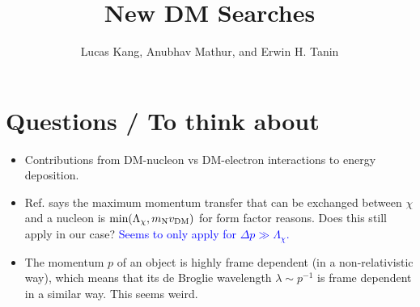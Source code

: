 \documentclass[%
 reprint,
 amsmath,amssymb,
 aps,nofootinbib
]{revtex4-1}
\begin{document}
\title{New DM Searches}
\author{Lucas Kang, Anubhav Mathur, and Erwin H. Tanin}


\maketitle



\tableofcontents
\section{Questions / To think about}
\begin{itemize}
\item Contributions from DM-nucleon vs DM-electron interactions to energy deposition.
\item Ref. \cite{Grabowska:2018lnd} says the maximum momentum transfer that can be exchanged between $\chi$ and a nucleon is $\text{min}(\Lambda_\chi,m_{\rm N}v_{\rm DM})$ for form factor reasons. Does this still apply in our case? \textcolor{blue}{Seems to only apply for $\Delta p\gg \Lambda_\chi$.}
\item The momentum $p$ of an object is highly frame dependent (in a non-relativistic way), which means that its de Broglie wavelength $\lambda\sim p^{-1}$ is frame dependent in a similar way. This seems weird.
\end{itemize}
 
 
 
\end{document}
